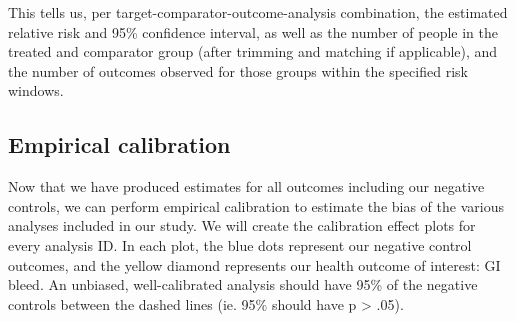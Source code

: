 \documentclass[
]{article}
\newenvironment{Shaded}{\begin{snugshade}}{\end{snugshade}}
\newcommand{\CommentTok}[1]{\textcolor[rgb]{0.56,0.35,0.01}{\textit{#1}}}
\newcommand{\DecValTok}[1]{\textcolor[rgb]{0.00,0.00,0.81}{#1}}
\newcommand{\KeywordTok}[1]{\textcolor[rgb]{0.13,0.29,0.53}{\textbf{#1}}}
\newcommand{\NormalTok}[1]{#1}
\newcommand{\OperatorTok}[1]{\textcolor[rgb]{0.81,0.36,0.00}{\textbf{#1}}}
\newcommand{\StringTok}[1]{\textcolor[rgb]{0.31,0.60,0.02}{#1}}
\begin{document}
This tells us, per target-comparator-outcome-analysis combination, the
estimated relative risk and 95\% confidence interval, as well as the
number of people in the treated and comparator group (after trimming and
matching if applicable), and the number of outcomes observed for those
groups within the specified risk windows.

\hypertarget{empirical-calibration}{%
\subsection{Empirical calibration}\label{empirical-calibration}}

Now that we have produced estimates for all outcomes including our
negative controls, we can perform empirical calibration to estimate the
bias of the various analyses included in our study. We will create the
calibration effect plots for every analysis ID. In each plot, the blue
dots represent our negative control outcomes, and the yellow diamond
represents our health outcome of interest: GI bleed. An unbiased,
well-calibrated analysis should have 95\% of the negative controls
between the dashed lines (ie. 95\% should have p \textgreater{} .05).

\begin{Shaded}
\end{Shaded}
\end{document}
